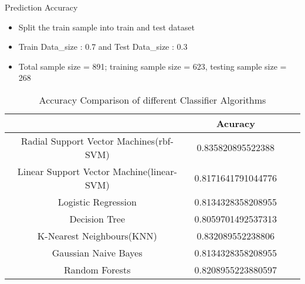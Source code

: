 \documentclass[
 size=14pt,
 paper=smartboard,  %
 mode=present, 		%
 display=slides, 	%
 style=tuliplab,  	%
 pauseslide,
 fleqn,leqno]{powerdot}
\begin{document}
\begin{slide}{Prediction Accuracy}

\begin{itemize}
\item 
   Split the train sample into train and test dataset
   \item 
   Train Data_size : 0.7 and Test Data_size : 0.3
   \item 
   Total sample size = 891; training sample size = 623, testing sample size = 268
  \end{itemize}

\begin{table}
\setlength{\abovecaptionskip}{0pt}
\setlength{\belowcaptionskip}{10pt}
\centering
\caption{Accuracy Comparison of different Classifier Algorithms}

\begin{tabular}{cccc}
  \toprule
   & Acuracy \\
\midrule
  Radial Support Vector Machines(rbf-SVM)   & 0.835820895522388 \\
  Linear Support Vector Machine(linear-SVM) & 0.8171641791044776 \\
  Logistic Regression & 0.8134328358208955 \\
  Decision Tree & 0.8059701492537313 \\
  K-Nearest Neighbours(KNN) & 0.832089552238806 \\
  Gaussian Naive Bayes & 0.8134328358208955 \\
  Random Forests & 0.8208955223880597\\
\bottomrule
\end{tabular}
\end{table}

\end{slide}





\end{document}

